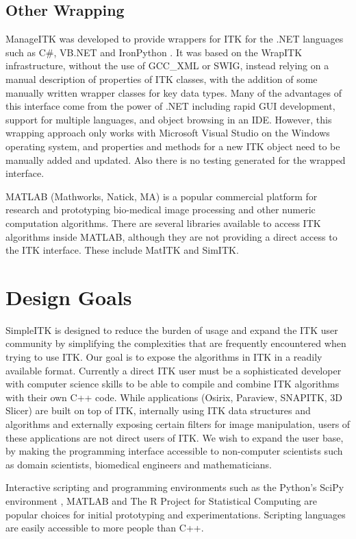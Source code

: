 \documentclass{frontiersMED} %
\begin{document}
\subsection{Other Wrapping}
ManageITK was developed to provide
wrappers for ITK for the .NET languages such as C\#, VB.NET and
IronPython \cite{Mueller2007}. It was based on the WrapITK infrastructure, without the
use of GCC\_XML or SWIG, instead relying on a manual description of
properties of ITK classes, with the addition of some manually written
wrapper classes for key data types. Many of the advantages of this
interface come from the power of .NET including rapid GUI development,
support for multiple languages, and object browsing in an
IDE. However, this wrapping approach only works with Microsoft Visual
Studio on the Windows operating system, and properties and methods for
a new ITK object need to be manually added and updated.  Also there is
no testing generated for the wrapped interface.

MATLAB  (Mathworks, Natick, MA) is a popular commercial platform for research and
prototyping bio-medical image processing and other numeric computation
algorithms. There are several libraries available to access ITK
algorithms inside MATLAB, although they are not providing a direct
access to the ITK interface. These include MatITK\cite{Chu2006} and
SimITK\cite{Dickinson2011}.

\section{Design Goals}

SimpleITK is designed to reduce the burden of usage and expand the ITK
user community by simplifying the complexities that are frequently
encountered when trying to use ITK. Our goal is to expose the
algorithms in ITK in a readily available format. Currently a direct
ITK user must be a sophisticated developer with computer science
skills to be able to compile and combine ITK algorithms with their own
C++ code. While applications (Osirix, Paraview, SNAPITK, 3D Slicer)
are built on top of ITK, internally using ITK data structures and
algorithms and externally exposing certain filters for image
manipulation, users of these applications are not direct users of
ITK. We wish to expand the user base, by making the programming
interface accessible to non-computer scientists such as domain
scientists, biomedical engineers and mathematicians.

Interactive scripting and programming environments such as the
Python's SciPy environment \cite{Jones2001}, MATLAB
and The R Project for Statistical Computing are popular choices for
initial prototyping and experimentations. Scripting languages are
easily accessible to more people than C++.
\end{document}
